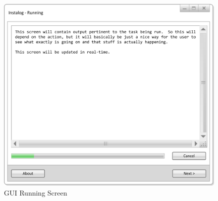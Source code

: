 \begin{figure}[h]
  	\centering
	\includegraphics{figures/gui/Running.png}
  	\caption{GUI Running Screen}
  	\label{fig:gui_running}
\end{figure}

